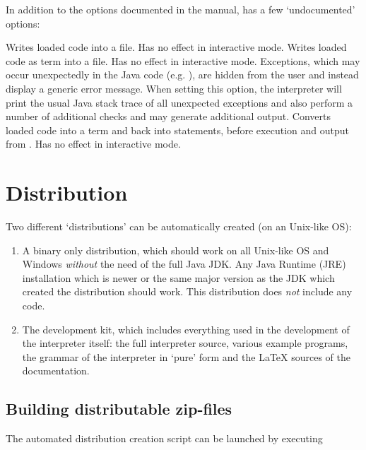 In addition to the options documented in the manual, \setlX{} has a few `undocumented' options:

\begin{itemize}
	      {Writes loaded code into a file. Has no effect in interactive mode.}
	      {Writes loaded code as term into a file. Has no effect in interactive mode.}
	      {Exceptions, which may occur unexpectedly in the Java code (e.g. ), are hidden from the user and instead display a generic error message.
		When setting this option, the interpreter will print the usual Java stack trace of all unexpected exceptions and also perform a number of additional checks and may generate additional output.}
	      {Converts loaded code into a term and back into statements, before execution and output from .  Has no effect in interactive mode.}
\end{itemize}

\section{Distribution}

Two different `distributions' can be automatically created (on an Unix-like OS):

\begin{enumerate}
	\item A binary only distribution, which should work on all Unix-like OS and Windows \emph{without} the need of the full Java JDK.
		Any Java Runtime (JRE) installation which is newer or the same major version as the JDK which created the distribution should work.
		This distribution does \emph{not} include any \SetlX{} code.

	\item The development kit, which includes everything used in the development of the interpreter itself: the full interpreter source, various \SetlX{} example programs, the grammar of the interpreter in `pure' form and the \LaTeX{} sources of the documentation.
\end{enumerate}

\subsection{Building distributable zip-files}

The automated distribution creation script can be launched by executing


